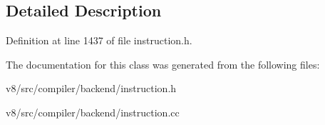 \subsection{Detailed Description}


Definition at line 1437 of file instruction.\+h.



The documentation for this class was generated from the following files\+:\begin{DoxyCompactItemize}
\item 
v8/src/compiler/backend/instruction.\+h\item 
v8/src/compiler/backend/instruction.\+cc\end{DoxyCompactItemize}
